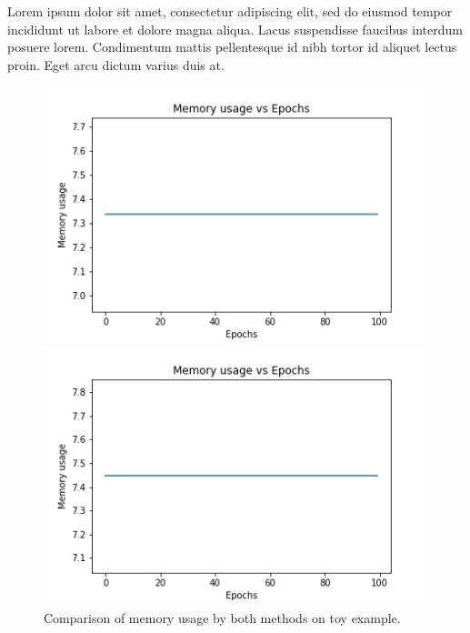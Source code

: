 \documentclass{cup-ino}
\begin{document}
Lorem ipsum dolor sit amet, consectetur adipiscing elit, sed do eiusmod tempor incididunt ut labore et dolore magna aliqua. Lacus suspendisse faucibus interdum posuere lorem. Condimentum mattis pellentesque id nibh tortor id aliquet lectus proin. Eget arcu dictum varius duis at.
\begin{figure}[h!]
\begin{minipage}{0.47\textwidth}
\includegraphics[width=\linewidth]{images/gen_toy_mem.jpeg}
\end{minipage}
\hfill
\begin{minipage}{0.47\textwidth}
\includegraphics[width=\linewidth]{images/grad_toy_mem.jpeg}
\end{minipage}

\caption{Comparison of memory usage by both methods on toy example.}
\label{fig:toy_mem}
\end{figure}
\end{document}
